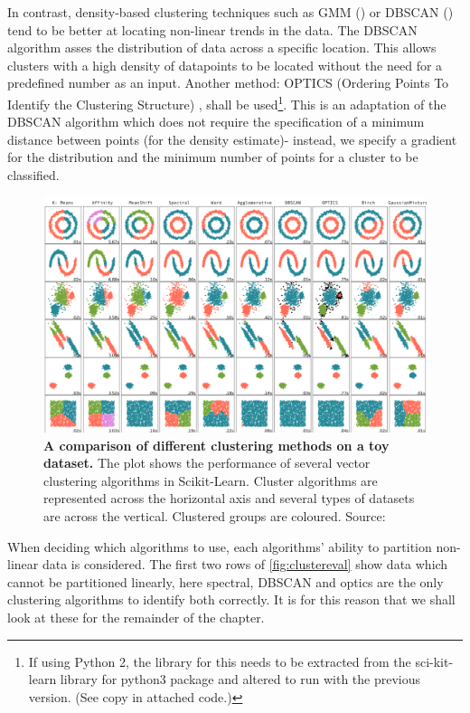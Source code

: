 In contrast, density-based clustering techniques such as GMM (\citep{scikit}) or DBSCAN (\citep{DBSCAN}) tend to be better at locating non-linear trends in the data. The DBSCAN algorithm asses the distribution of data across a specific location. This allows clusters with a high density of datapoints to be located without the need for a predefined number as an input. Another method: OPTICS (Ordering Points To Identify the Clustering Structure) \citep{optics}, shall be used\footnote{ If using Python 2, the library for this needs to be extracted from the sci-kit-learn library for python3 package and altered to run with the previous version. (See copy in attached code.)}. This is an adaptation of the DBSCAN algorithm which does not require the specification of a minimum distance between points (for the density estimate)- instead, we specify a gradient for the distribution and the minimum number of points for a cluster to be classified.


\begin{figure}[H]
     \centering

         \includegraphics[width=\textwidth]{4fig/clustereval.png}

        \caption{\textbf{A comparison of different clustering methods on a toy dataset.} The plot shows the performance of several vector clustering algorithms in Scikit-Learn. Cluster algorithms are represented across the horizontal axis and several types of datasets are across the vertical. Clustered groups are coloured. Source: \cite{clustereval}}
        \label{fig:clustereval}
\end{figure}


When deciding which algorithms to use, each algorithms' ability to partition non-linear data is considered.
The first two rows of \autoref{fig:clustereval} show data which cannot be partitioned linearly, here spectral, DBSCAN and optics are the only clustering algorithms to identify both correctly. It is for this reason that we shall look at these for the remainder of the chapter.

